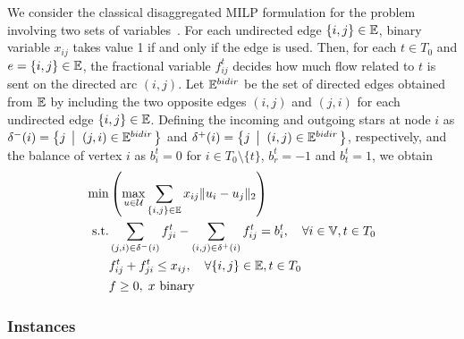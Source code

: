 \documentclass[12pt]{article}
\begin{document}
We consider the classical disaggregated MILP formulation for the problem involving two sets of variables~\citep{magnanti1984network}. 
For each undirected edge $\{i,j\}\in \mathbb{E}$, binary variable $x_{ij}$ takes value 1 if and only if the edge is used. Then, for each $t\in T_0$ and $e=\{i,j\}\in \mathbb{E}$, the fractional variable $f^t_{ij}$ decides how much flow related to $t$ is sent on the directed arc $(i,j)$. 
Let $\mathbb{E}^{bidir}$ be the set of directed edges obtained from $\mathbb{E}$ by including the two opposite edges $(i,j)$ and $(j,i)$ for each undirected edge $\{i,j\}\in \mathbb{E}$. Defining the incoming and outgoing stars at node $i$ as $\delta^-(i)=\left\{j \; \left|\;\; (j,i)\in \mathbb{E}^{bidir} \right.\right\}$ and $\delta^+(i)=\left\{j \; \left|\;\; (i,j)\in \mathbb{E}^{bidir} \right.\right\}$, respectively, and the balance of vertex $i$ as $b^t_i=0$ for $i\in T_0\setminus\{t\}$, $b^t_{r}=-1$ and $b^t_t=1$, we obtain
\begin{align*}
\min & \left(\max_{u\in \mathcal{U}} \sum_{\{i,j\}\in \mathbb{E}}x_{ij}\|u_i-u_j\|_2\right) \\
\mbox{s.t.} &\sum_{(j,i)\in \delta^-(i)} f^t_{ji} - \sum_{(i,j)\in \delta^+(i)} f^t_{ij} = b^t_i,\quad\forall i\in \mathbb{V}, t\in T_0 \\
& f_{ij}^t+f_{ji}^t \leq x_{ij},\quad \forall \{i,j\}\in \mathbb{E}, t\in T_0 \\
& f\geq0,\; x\text{ binary} 
\end{align*}
\subsubsection{Instances}
\end{document}
